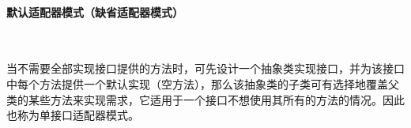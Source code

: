 \paragraph*{默认适配器模式（缺省适配器模式）}~{} \par
当不需要全部实现接口提供的方法时，可先设计一个抽象类实现接口，并为该接口中每个方法提供一个默认实现（空方法），那么该抽象类的子类可有选择地覆盖父类的某些方法来实现需求，它适用于一个接口不想使用其所有的方法的情况。因此也称为单接口适配器模式。
\begin{figure}[H]
	\centering
    \vspace{-0.5em}
    \hfill
\end{figure}
